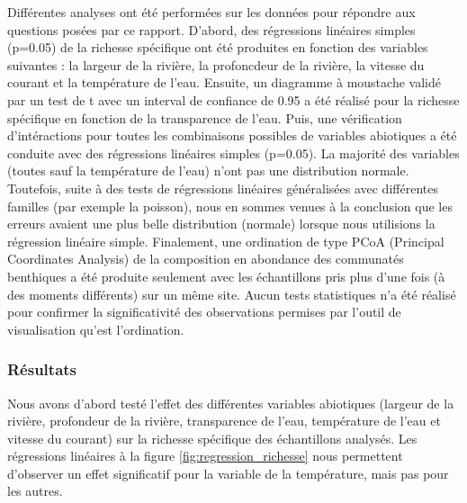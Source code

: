 \documentclass[9pt,twocolumn,twoside,]{pnas-new}
\begin{document}
Différentes analyses ont été performées sur les données pour répondre
aux questions posées par ce rapport. D'abord, des régressions linéaires
simples (p=0.05) de la richesse spécifique ont été produites en fonction
des variables suivantes : la largeur de la rivière, la profoncdeur de la
rivière, la vitesse du courant et la température de l'eau. Ensuite, un
diagramme à moustache validé par un test de t avec un interval de
confiance de 0.95 a été réalisé pour la richesse spécifique en fonction
de la transparence de l'eau. Puis, une vérification d'intéractions pour
toutes les combinaisons possibles de variables abiotiques a été conduite
avec des régressions linéaires simples (p=0.05). La majorité des
variables (toutes sauf la température de l'eau) n'ont pas une
distribution normale. Toutefois, suite à des tests de régressions
linéaires généralisées avec différentes familles (par exemple la
poisson), nous en sommes venues à la conclusion que les erreurs avaient
une plus belle distribution (normale) lorsque nous utilisions la
régression linéaire simple. Finalement, une ordination de type PCoA
(Principal Coordinates Analysis) de la composition en abondance des
communatés benthiques a été produite seulement avec les échantillons
pris plus d'une fois (à des moments différents) sur un même site. Aucun
tests statistiques n'a été réalisé pour confirmer la significativité des
observations permises par l'outil de visualisation qu'est l'ordination.

\hypertarget{ruxe9sultats}{%
\subsubsection*{Résultats}\label{ruxe9sultats}}

Nous avons d'abord testé l'effet des différentes variables abiotiques
(largeur de la rivière, profondeur de la rivière, transparence de l'eau,
température de l'eau et vitesse du courant) sur la richesse spécifique
des échantillons analysés. Les régressions linéaires à la figure
\ref{fig:regression_richesse} nous permettent d'observer un effet
significatif pour la variable de la température, mais pas pour les
autres.
\end{document}
